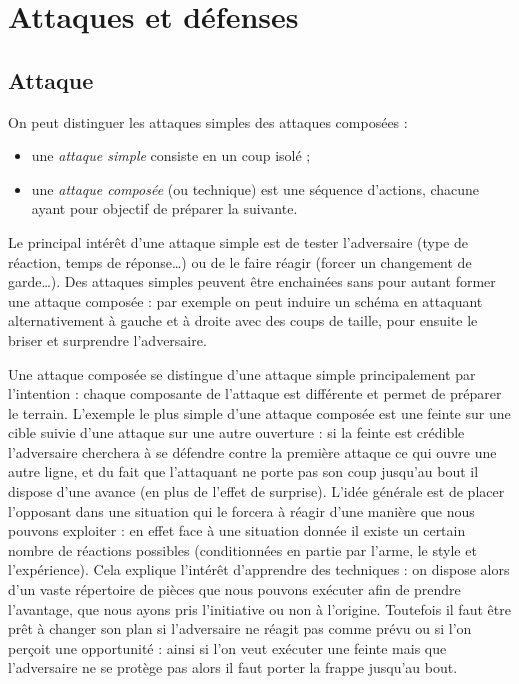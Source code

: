 \chapter{Attaques et défenses}




\section{Attaque}
\label{sec:att-def:attaque}

\begin{definition}

\noindent
On peut distinguer les attaques simples des attaques composées :
\begin{itemize}
	\item une \emph{attaque simple} consiste en un coup isolé ;
	\item une \emph{attaque composée} (ou technique) est une séquence d'actions, chacune ayant pour objectif de préparer la suivante.
\end{itemize}
\end{definition}


Le principal intérêt d'une attaque simple est de tester l'adversaire (type de réaction, temps de réponse…) ou de le faire réagir (forcer un changement de garde…).
Des attaques simples peuvent être enchainées sans pour autant former une attaque composée : par exemple on peut induire un schéma en attaquant alternativement à gauche et à droite avec des coups de taille, pour ensuite le briser et surprendre l'adversaire.

Une attaque composée se distingue d'une attaque simple principalement par l'intention : chaque composante de l'attaque est différente et permet de préparer le terrain.
L'exemple le plus simple d'une attaque composée est une feinte sur une cible suivie d'une attaque sur une autre ouverture : si la feinte est crédible l'adversaire cherchera à se défendre contre la première attaque ce qui ouvre une autre ligne, et du fait que l'attaquant ne porte pas son coup jusqu'au bout il dispose d'une avance (en plus de l'effet de surprise).
L'idée générale est de placer l'opposant dans une situation qui le forcera à réagir d'une manière que nous pouvons exploiter : en effet face à une situation donnée il existe un certain nombre de réactions possibles (conditionnées en partie par l'arme, le style et l'expérience).
Cela explique l'intérêt d'apprendre des techniques : on dispose alors d'un vaste répertoire de pièces que nous pouvons exécuter afin de prendre l'avantage, que nous ayons pris l'initiative ou non à l'origine.
Toutefois il faut être prêt à changer son plan si l'adversaire ne réagit pas comme prévu ou si l'on perçoit une opportunité : ainsi si l'on veut exécuter une feinte mais que l'adversaire ne se protège pas alors il faut porter la frappe jusqu'au bout.

